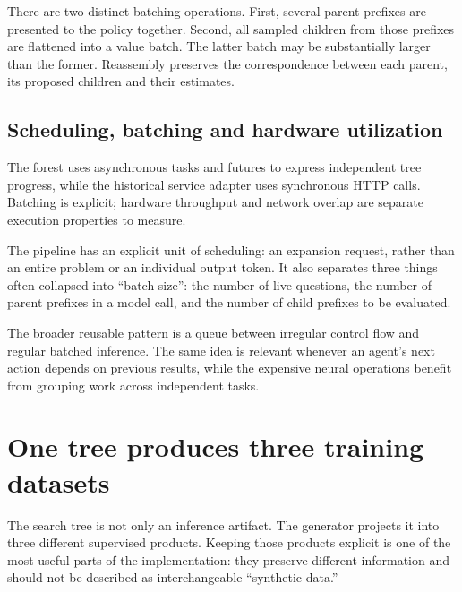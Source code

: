 \documentclass[11pt,letterpaper]{article}
\begin{document}
There are two distinct batching operations. First, several parent prefixes are presented to the policy together. Second, all sampled children from those prefixes are flattened into a value batch. The latter batch may be substantially larger than the former. Reassembly preserves the correspondence between each parent, its proposed children and their estimates.

\subsection{Scheduling, batching and hardware utilization}
The forest uses asynchronous tasks and futures to express independent tree progress, while the historical service adapter uses synchronous HTTP calls. Batching is explicit; hardware throughput and network overlap are separate execution properties to measure.

The pipeline has an explicit unit of scheduling: an expansion request, rather than an entire problem or an individual output token. It also separates three things often collapsed into ``batch size'': the number of live questions, the number of parent prefixes in a model call, and the number of child prefixes to be evaluated.

The broader reusable pattern is a queue between irregular control flow and regular batched inference. The same idea is relevant whenever an agent's next action depends on previous results, while the expensive neural operations benefit from grouping work across independent tasks.

\section{One tree produces three training datasets}
The search tree is not only an inference artifact. The generator projects it into three different supervised products. Keeping those products explicit is one of the most useful parts of the implementation: they preserve different information and should not be described as interchangeable ``synthetic data.''
\end{document}
